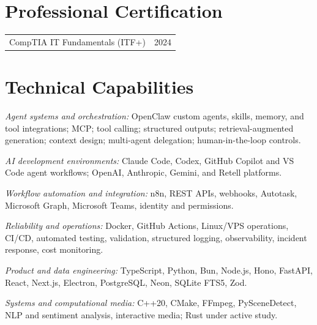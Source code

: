 \documentclass[letterpaper,11pt]{article}
\makeatletter
\newcommand{\projectentry}[2]{
  \Needspace{4\baselineskip}
  \begin{tabularx}{\textwidth}{@{}X@{\hspace{1em}}r@{}}
    #1 & #2
  \end{tabularx}
}
\newcommand{\skillentry}[2]{
  \Needspace{2\baselineskip}
  \textit{#1:} #2\par\vspace{4pt}
}
\makeatother
\begin{document}
\section{Professional Certification}
\projectentry{CompTIA IT Fundamentals (ITF+)}{2024}

\section{Technical Capabilities}
\skillentry{Agent systems and orchestration}{OpenClaw custom agents, skills, memory, and tool integrations; MCP; tool calling; structured outputs; retrieval-augmented generation; context design; multi-agent delegation; human-in-the-loop controls.}
\skillentry{AI development environments}{Claude Code, Codex, GitHub Copilot and VS Code agent workflows; OpenAI, Anthropic, Gemini, and Retell platforms.}
\skillentry{Workflow automation and integration}{n8n, REST APIs, webhooks, Autotask, Microsoft Graph, Microsoft Teams, identity and permissions.}
\skillentry{Reliability and operations}{Docker, GitHub Actions, Linux/VPS operations, CI/CD, automated testing, validation, structured logging, observability, incident response, cost monitoring.}
\skillentry{Product and data engineering}{TypeScript, Python, Bun, Node.js, Hono, FastAPI, React, Next.js, Electron, PostgreSQL, Neon, SQLite FTS5, Zod.}
\skillentry{Systems and computational media}{C++20, CMake, FFmpeg, PySceneDetect, NLP and sentiment analysis, interactive media; Rust under active study.}
\end{document}

